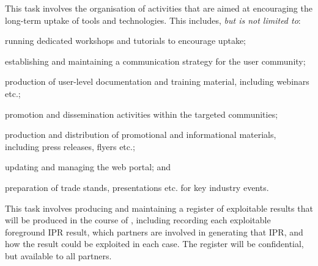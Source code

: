 \begin{Workpackage}{\thewpno}
\begin{Task}
This task involves the organisation of activities that are aimed at encouraging the long-term uptake of \TheProject{} tools and technologies.
This includes, \emph{but is not limited to}:
\begin{inparaenum}
\item
running dedicated workshops and tutorials to encourage uptake;
\item
establishing and maintaining a communication strategy for the user community;
\item
production of user-level documentation and training material, including webinars etc.;
\item
promotion and dissemination activities within the targeted communities;
\item
production and distribution of promotional and informational materials, including press releases, flyers etc.;
\item
updating and managing the web portal;
and
\item
preparation of trade stands, presentations etc. for key industry events.
\end{inparaenum}
\end{Task}

\begin{Task}


\TaskResults{%
\ref{del:dissemplan1};
\ref{del:dissemplan2}
}
\TaskHeader{}
This task involves producing and maintaining a register of exploitable results that will be produced in the course of \TheProject{}, including recording each exploitable foreground IPR result, which partners are involved in generating that IPR, and how the result could be exploited in each case.
The register will be confidential, but available to all partners.
\end{Task}


\end{Workpackage}
